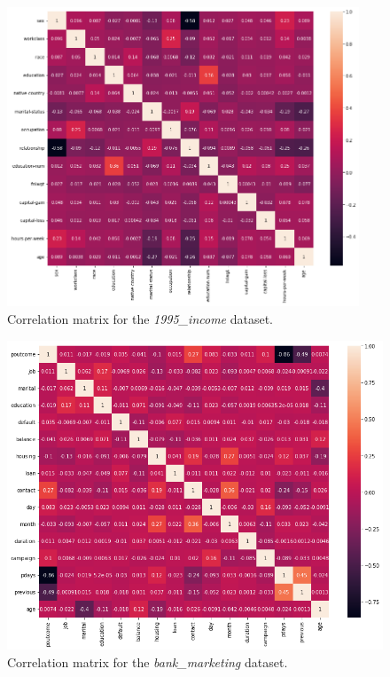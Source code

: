 \documentclass{article}
\begin{document}
\begin{figure}[hpt]
  \begin{center}
      \includegraphics[width=10.5cm]{income-correlation.png}
  \end{center}
  \caption{Correlation matrix for the \textit{1995\_income} dataset.}
  \label{fig:correlation-income}
\end{figure}

\begin{figure}[hpt]
  \begin{center}
      \includegraphics[width=11.5cm]{bank-correlation.png}
  \end{center}
  \caption{Correlation matrix for the \textit{bank\_marketing} dataset.}
  \label{fig:correlation-bank}
\end{figure}
\end{document}

